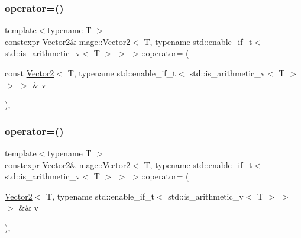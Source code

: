 \subsubsection{\texorpdfstring{operator=()}{operator=()}\hspace{0.1cm}{\footnotesize\ttfamily [1/2]}}
{\footnotesize\ttfamily template$<$typename T $>$ \\
constexpr \hyperlink{structmage_1_1_vector2}{Vector2}\& \hyperlink{structmage_1_1_vector2}{mage\+::\+Vector2}$<$ T, typename std\+::enable\+\_\+if\+\_\+t$<$ std\+::is\+\_\+arithmetic\+\_\+v$<$ T $>$ $>$ $>$\+::operator= (\begin{DoxyParamCaption}\item[{const \hyperlink{structmage_1_1_vector2}{Vector2}$<$ T, typename std\+::enable\+\_\+if\+\_\+t$<$ std\+::is\+\_\+arithmetic\+\_\+v$<$ T $>$ $>$ $>$ \&}]{v }\end{DoxyParamCaption})\hspace{0.3cm}{\ttfamily [default]}, {\ttfamily [noexcept]}}

\hypertarget{structmage_1_1_vector2_3_01_t_00_01typename_01std_1_1enable__if__t_3_01std_1_1is__arithmetic__v_3_01_t_01_4_01_4_01_4_ae4d5a089c4b4017c4950841b7d53a0bf}{}\label{structmage_1_1_vector2_3_01_t_00_01typename_01std_1_1enable__if__t_3_01std_1_1is__arithmetic__v_3_01_t_01_4_01_4_01_4_ae4d5a089c4b4017c4950841b7d53a0bf} 
\subsubsection{\texorpdfstring{operator=()}{operator=()}\hspace{0.1cm}{\footnotesize\ttfamily [2/2]}}
{\footnotesize\ttfamily template$<$typename T $>$ \\
constexpr \hyperlink{structmage_1_1_vector2}{Vector2}\& \hyperlink{structmage_1_1_vector2}{mage\+::\+Vector2}$<$ T, typename std\+::enable\+\_\+if\+\_\+t$<$ std\+::is\+\_\+arithmetic\+\_\+v$<$ T $>$ $>$ $>$\+::operator= (\begin{DoxyParamCaption}\item[{\hyperlink{structmage_1_1_vector2}{Vector2}$<$ T, typename std\+::enable\+\_\+if\+\_\+t$<$ std\+::is\+\_\+arithmetic\+\_\+v$<$ T $>$ $>$ $>$ \&\&}]{v }\end{DoxyParamCaption})\hspace{0.3cm}{\ttfamily [default]}, {\ttfamily [noexcept]}}

